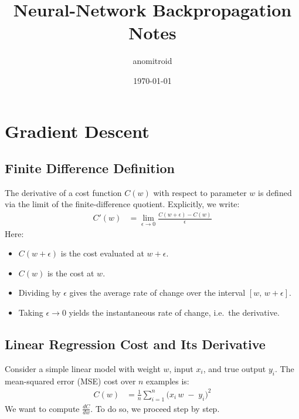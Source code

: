 \documentclass{article}
\title{Neural-Network Backpropagation Notes}
\author{anomitroid}
\date{\today}
\begin{document}
\maketitle

\section{Gradient Descent}

\subsection{Finite Difference Definition}\label{sec:finite-difference}

\noindent The derivative of a cost function \(C(w)\) with respect to parameter \(w\) is defined via the limit of the finite-difference quotient. Explicitly, we write:
\begin{align}
    C'(w)
    &= \lim_{\epsilon \to 0} \frac{C(w + \epsilon) - C(w)}{\epsilon}
\end{align}
\noindent Here:
\begin{itemize}
    \item \(C(w + \epsilon)\) is the cost evaluated at \(w + \epsilon\).
    \item \(C(w)\) is the cost at \(w\).
    \item Dividing by \(\epsilon\) gives the average rate of change over the interval \([w,\,w+\epsilon]\).
    \item Taking \(\epsilon \to 0\) yields the instantaneous rate of change, i.e.\ the derivative.
\end{itemize}

\vspace{1em}

\subsection{Linear Regression Cost and Its Derivative}\label{sec:linear-regression}

\noindent Consider a simple linear model with weight \(w\), input \(x_i\), and true output \(y_i\).  The mean-squared error (MSE) cost over \(n\) examples is:
\begin{align}
    C(w) 
    &= \frac{1}{n} \sum_{i=1}^{n} {\bigl(x_i \,w \;-\; y_i\bigr)}^2
\end{align}
We want to compute \(\frac{dC}{dw}\).  To do so, we proceed step by step.
\end{document}

